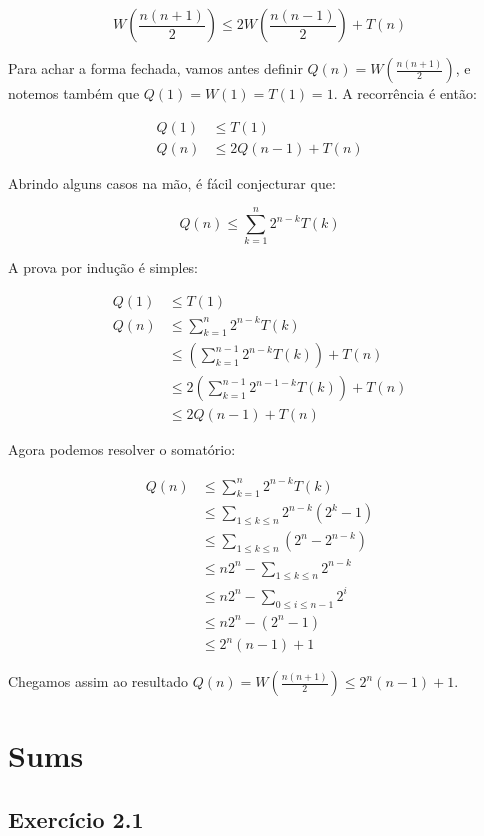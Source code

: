 \documentclass[10pt]{book}
\begin{document}
\[ W\left(\frac{n(n+1)}{2}\right) \leq 2W\left(\frac{n(n-1)}{2}\right) + T(n) \]

Para achar a forma fechada, vamos antes definir $Q(n)=W(\frac{n(n+1)}{2})$, e notemos também que $Q(1)=W(1)=T(1)=1$. A recorrência é então:

\begin{align*}
  Q(1) &\leq T(1) \\
  Q(n) &\leq 2Q(n-1) + T(n)
\end{align*}

Abrindo alguns casos na mão, é fácil conjecturar que:

\[ Q(n) \leq \sum_{k=1}^{n}2^{n-k}T(k) \]

A prova por indução é simples:

\begin{align*}
  Q(1) &\leq T(1) \\
  Q(n) &\leq \sum_{k=1}^{n}2^{n-k}T(k) \\
   &\leq \left( \sum_{k=1}^{n-1}2^{n-k}T(k) \right) + T(n) \\
   &\leq 2 \left( \sum_{k=1}^{n-1}2^{n-1-k}T(k) \right) + T(n) \\
   &\leq 2Q(n-1) + T(n)
\end{align*}

Agora podemos resolver o somatório:

\begin{align*}
 Q(n) &\leq \sum_{k=1}^{n}2^{n-k}T(k) \\
      &\leq \sum_{1\leq k \leq n}2^{n-k}(2^k-1) \\
      &\leq \sum_{1\leq k \leq n}(2^n - 2^{n-k}) \\
      &\leq n2^n - \sum_{1\leq k \leq n}2^{n-k} \\
      &\leq n2^n - \sum_{0\leq i \leq n-1}2^i \\
      &\leq n2^n - (2^n -1) \\
      &\leq 2^n(n-1) +1
\end{align*}

Chegamos assim ao resultado $Q(n)=W(\frac{n(n+1)}{2}) \leq 2^n(n-1)+1$.

\chapter{Sums}

\section{Exercício 2.1}
\end{document}
